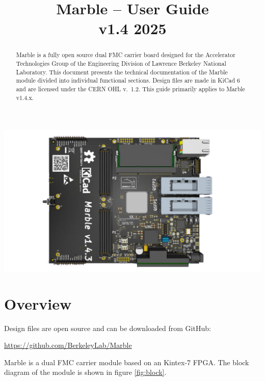 \documentclass[12pt,oneside,a4]{article}
\title{Marble -- User Guide\\ \small{v1.4 2025}}
\author{}
\begin{document}
\maketitle
\begin{center}
\includegraphics[width=0.8\linewidth]{marble_top.png}
\end{center}
\begin{abstract}
Marble is a fully open source dual FMC carrier board designed for the Accelerator Technologies Group of the Engineering Division of Lawrence Berkeley National Laboratory. This document presents the technical documentation of the Marble module divided into individual functional sections.
Design files are made in KiCad 6 and are licensed under the CERN OHL \hbox{v.~1.2}.
This guide primarily applies to Marble v1.4.x.
\end{abstract}

\clearpage
\tableofcontents

\clearpage

\section{Overview}

Design files are open source and can be downloaded from GitHub:

\begin{leftbar}
\url{https://github.com/BerkeleyLab/Marble}
\end{leftbar}

Marble is a dual FMC carrier module based on an Kintex-7 FPGA. The block diagram of the module is shown in figure \ref{fig:block}.
\end{document}
